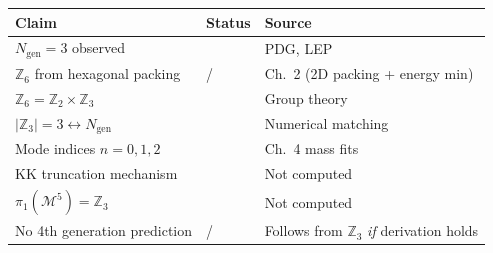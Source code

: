 \begin{tcolorbox}[colback=orange!5, colframe=orange!50!black,
    title=\textbf{Epistemic Audit: Chapter 5}]
\begin{center}
\small
\begin{tabular}{lll}
\toprule
\textbf{Claim} & \textbf{Status} & \textbf{Source} \\
\midrule
$N_{\text{gen}} = 3$ observed & \tagBL{} & PDG, LEP \\
$\mathbb{Z}_6$ from hexagonal packing & \tagDc{}/\tagP{} & Ch.~2 (2D packing + energy min) \\
$\mathbb{Z}_6 = \mathbb{Z}_2 \times \mathbb{Z}_3$ & \tagM{} & Group theory \\
$|\mathbb{Z}_3| = 3 \leftrightarrow N_{\text{gen}}$ & \tagI{} & Numerical matching \\
Mode indices $n = 0,1,2$ & \tagI{} & Ch.~4 mass fits \\
KK truncation mechanism & \tagP{} & Not computed \\
$\pi_1(\mathcal{M}^5) = \mathbb{Z}_3$ & \tagP{} & Not computed \\
No 4th generation prediction & \tagI{}/\tagP{} & Follows from $\mathbb{Z}_3$ \emph{if} derivation holds \\
\bottomrule
\end{tabular}
\end{center}
\end{tcolorbox}

